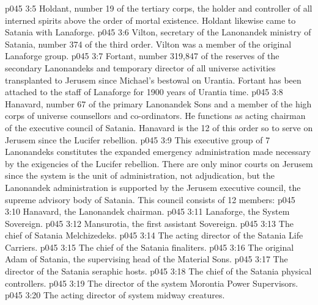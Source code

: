 \vs p045 3:5 \bibnobreakspace {} Holdant, number 19 of the tertiary corps, the holder and controller of all interned spirits above the order of mortal existence. Holdant likewise came to Satania with Lanaforge.
\vs p045 3:6 \bibnobreakspace {} Vilton, secretary of the Lanonandek ministry of Satania, number 374 of the third order. Vilton was a member of the original Lanaforge group.
\vs p045 3:7 \bibnobreakspace {} Fortant, number 319,847 of the reserves of the secondary Lanonandeks and temporary director of all universe activities transplanted to Jerusem since Michael’s bestowal on Urantia. Fortant has been attached to the staff of Lanaforge for 1900 years of Urantia time.
\vs p045 3:8 \bibnobreakspace {} Hanavard, number 67 of the primary Lanonandek Sons and a member of the high corps of universe counsellors and co\hyp{}ordinators. He functions as acting chairman of the executive council of Satania. Hanavard is the 12 of this order so to serve on Jerusem since the Lucifer rebellion.
\vs p045 3:9 \pc This executive group of 7 Lanonandeks constitutes the expanded emergency administration made necessary by the exigencies of the Lucifer rebellion. There are only minor courts on Jerusem since the system is the unit of administration, not adjudication, but the Lanonandek administration is supported by the Jerusem executive council, the supreme advisory body of Satania. This council consists of 12 members:
\vs p045 3:10 \bibnobreakspace Hanavard, the Lanonandek chairman.
\vs p045 3:11 \bibnobreakspace Lanaforge, the System Sovereign.
\vs p045 3:12 \bibnobreakspace Mansurotia, the first assistant Sovereign.
\vs p045 3:13 \bibnobreakspace The chief of Satania Melchizedeks.
\vs p045 3:14 \bibnobreakspace The acting director of the Satania Life Carriers.
\vs p045 3:15 \bibnobreakspace The chief of the Satania finaliters.
\vs p045 3:16 \bibnobreakspace The original Adam of Satania, the supervising head of the Material Sons.
\vs p045 3:17 \bibnobreakspace The director of the Satania seraphic hosts.
\vs p045 3:18 \bibnobreakspace The chief of the Satania physical controllers.
\vs p045 3:19 \bibnobreakspace The director of the system Morontia Power Supervisors.
\vs p045 3:20 \bibnobreakspace The acting director of system midway creatures.
